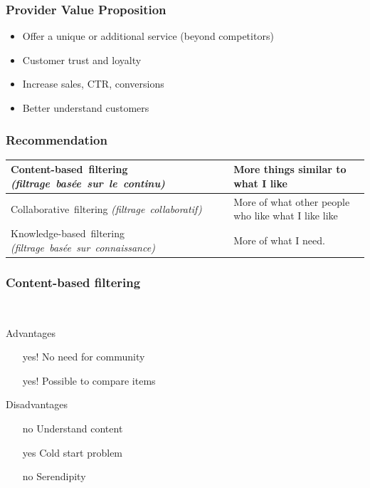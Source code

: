 \begin{frame}
  \frametitle{Provider Value Proposition}

  \begin{itemize}
  \item Offer a unique or additional service (beyond competitors)
  \item Customer trust and loyalty
  \item Increase sales, CTR, conversions
  \item Better understand customers
  \end{itemize}
\end{frame}


\begin{frame}
  \frametitle{Recommendation}

  \begin{tabular}{|p{5.7cm}|p{4cm}|}
    \hline
    \topstrut\hbox{Content-based filtering}
    \hbox{\it (filtrage basée sur le continu)}
    &
    More things similar to what I like\bottomstrut
    \\
    \hline
    \topstrut\hbox{Collaborative filtering}
    \hbox{\it (filtrage collaboratif)}
    &
    More of what other people who like what I like like
    \bottomstrut
    \\
    \hline
    \topstrut\hbox{Knowledge-based filtering}
    \hbox{\it (filtrage basée sur connaissance)}\bottomstrut
    &
    More of what I need.\bottomstrut
    \\
    \hline
  \end{tabular}
\end{frame}

\begin{frame}[t]
  \frametitle{Content-based filtering}
  \textit{}\\
  \textit{}

  Advantages
  \begin{itemize}
  \item [yes!] No need for community
  \item [yes!] Possible to compare items 
  \end{itemize}

  \bigskip
  Disadvantages
  \begin{itemize}
  \item [no] Understand content
  \item [yes] Cold start problem
  \item [no] Serendipity
  \end{itemize}
\end{frame}

